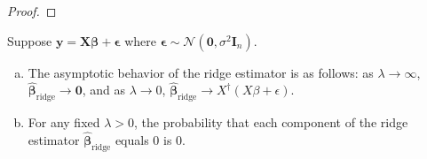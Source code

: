 \begin{proof}

\end{proof}


\begin{proposition}\label{linreg.dso.607.hw2} Suppose \(\boldsymbol{y} = \boldsymbol{X}\boldsymbol{\beta} + \boldsymbol{\epsilon}\) where \(\boldsymbol{\epsilon} \sim \mathcal{N}(\boldsymbol{0}, \sigma^2 \boldsymbol{I}_n)\).

\begin{enumerate}[(a)]

\item The asymptotic behavior of the ridge estimator is as follows: as \(\lambda \to \infty\), \(\hat{\boldsymbol{\beta}}_{\text{ridge}} \to \boldsymbol{0} \), and as \(\lambda \to 0\), \(\hat{\boldsymbol{\beta}}_{\text{ridge}} \to X^{\dagger}(X \beta + \epsilon)\).

\item For any fixed \(\lambda > 0\), the probability that each component of the ridge estimator \(\hat{\boldsymbol{\beta}}_{\text{ridge}}\) equals 0 is 0.

\end{enumerate}

\end{proposition}

